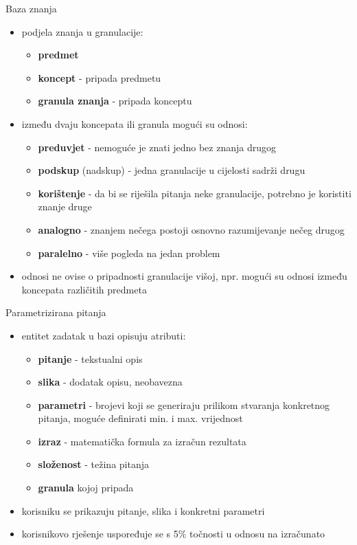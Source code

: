 \documentclass[times, utf8, numeric]{beamer}
\begin{document}
\begin{frame}{Baza znanja}
\begin{itemize}
	\item podjela znanja u granulacije:
	\begin{itemize}
		\item \textbf{predmet}
		\item \textbf{koncept} - pripada predmetu
		\item \textbf{granula znanja} - pripada konceptu
	\end{itemize}
	\item između dvaju koncepata ili granula mogući su odnosi:
	\begin{itemize}
		\item \textbf{preduvjet} - nemoguće je znati jedno bez znanja drugog
		\item \textbf{podskup} (nadskup) - jedna granulacije u cijelosti sadrži drugu
		\item \textbf{korištenje} - da bi se riješila pitanja neke granulacije, potrebno je koristiti znanje druge
		\item \textbf{analogno} - znanjem nečega postoji osnovno razumijevanje nečeg drugog
		\item \textbf{paralelno} - više pogleda na jedan problem
	\end{itemize}
	\item odnosi ne ovise o pripadnosti granulacije višoj, npr. mogući su odnosi između koncepata različitih predmeta
\end{itemize}
\end{frame}

\begin{frame}{Parametrizirana pitanja}
\begin{itemize}
	\item entitet zadatak u bazi opisuju atributi:
	\begin{itemize}
		\item \textbf{pitanje} - tekstualni opis
		\item \textbf{slika} - dodatak opisu, neobavezna
		\item \textbf{parametri} - brojevi koji se generiraju prilikom stvaranja konkretnog pitanja, moguće definirati min. i max. vrijednost
		\item \textbf{izraz} - matematička formula za izračun rezultata
		\item \textbf{složenost} - težina pitanja
		\item \textbf{granula} kojoj pripada
	\end{itemize}
	\item korisniku se prikazuju pitanje, slika i konkretni parametri
	\item korisnikovo rješenje uspoređuje se s 5\% točnosti u odnosu na izračunato
\end{itemize}
\end{frame}
\end{document}
